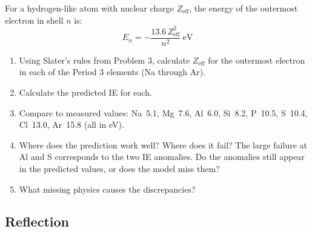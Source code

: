 \documentclass[12pt, a4paper]{book}
\begin{document}
\begin{deepbox}
\begin{enumerate}[label=\textbf{D\arabic*.}]
        For a hydrogen-like atom with nuclear charge $Z_\text{eff}$,
        the energy of the outermost electron in shell $n$ is:
        \[
          E_n = -\frac{13.6\,Z_\text{eff}^2}{n^2}\ \text{eV}
        \]

        \begin{enumerate}[label=(\alph*)]
          \item Using Slater's rules from Problem 3, calculate
                $Z_\text{eff}$ for the outermost electron in
                each of the Period 3 elements (Na through Ar).
          \item Calculate the predicted IE for each.
          \item Compare to measured values:
                Na~5.1, Mg~7.6, Al~6.0, Si~8.2,
                P~10.5, S~10.4, Cl~13.0, Ar~15.8 (all in eV).
          \item Where does the prediction work well?
                Where does it fail?
                The large failure at Al and S corresponds
                to the two IE anomalies.
                Do the anomalies still appear in the predicted
                values, or does the model miss them?
          \item What missing physics causes the discrepancies?
        \end{enumerate}

\end{enumerate}
\end{deepbox}

\subsection*{Reflection}
\end{document}
